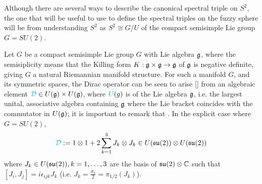 
\linea

Although there are several ways to describe the canonical spectral triple on  $S^2$, the one that will be useful to use to define the spectral triples on the fuzzy sphere will be from understanding $S^2$ as  $S^2 \cong G/U$ of the compact semisimple Lie group $G = SU(2)$.

Let $G$ be a compact semisimple Lie group $G$ with Lie algebra $\mathfrak{g}$, where the semisiplicity means that the Killing form $K: \mathfrak{g} \times \mathfrak{g} \to \mathfrak{g}$ of $\mathfrak{g}$ is negative definite, giving $G$ a natural Riemannian manifold structure. For such a manifold $G$, and its symmetric spaces, the Dirac operator can be seen to arise \ref{} from an algebraic element $\textcolor{cyan}{\mathcal D } \in U(\mathfrak{g})\times U(\mathfrak{g})$, where $\textcolor{cyan}{U}(g)$ is  of the Lie algebra $\mathfrak{g}$, i.e. the largest  unital, associative algebra containing $\mathfrak{g}$ where the Lie bracket coincides with the commutator in $U(\mathfrak{g})$; it is important to remark that . In the explicit case where $G = SU(2)$,
\begin{equation}
    \textcolor{cyan}{\mathcal D} := 1 \otimes 1 + 2 \sum_{k = 1}^3 J_k \otimes J_k \in U(\mathfrak{su}(2)) \otimes U(\mathfrak{su}(2))
\end{equation}
where $J_k \in U(\mathfrak{su}(2)), k = 1, \dots, 3$ are the basis of $\mathfrak{su}(2)\otimes \mathbb{C}$ such that $[J_i, J_j] = i \epsilon_{ijk} J_k$ (i.e. $J_k = \frac{\sigma_k}{2} = \pi_{1/2}(J_k)$). 

